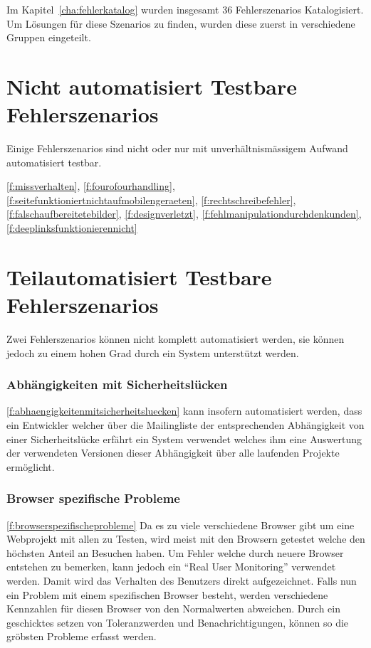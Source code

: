 Im Kapitel~\ref{cha:fehlerkatalog} wurden insgesamt 36 Fehlerszenarios Katalogisiert. Um Lösungen für diese Szenarios zu finden, wurden diese zuerst in verschiedene Gruppen eingeteilt.

\section{Nicht automatisiert Testbare Fehlerszenarios}
\label{sec:nicht_automatisiert_testbare_fehlerszenarios}
Einige Fehlerszenarios sind nicht oder nur mit unverhältnismässigem Aufwand automatisiert testbar.

\ref{f:missverhalten}, \ref{f:fourofourhandling}, \ref{f:seitefunktioniertnichtaufmobilengeraeten}, \ref{f:rechtschreibefehler}, \ref{f:falschaufbereitetebilder}, \ref{f:designverletzt}, \ref{f:fehlmanipulationdurchdenkunden}, \ref{f:deeplinksfunktionierennicht}

\section{Teilautomatisiert Testbare Fehlerszenarios}
\label{sec:teilautomatisiert_testbare_fehlerszenarios}
Zwei Fehlerszenarios können nicht komplett automatisiert werden, sie können jedoch zu einem hohen Grad durch ein System unterstützt werden.

\subsubsection{Abhängigkeiten mit Sicherheitslücken}
\label{ssub:kat_abhaengigkeitenmitsicherheitsluecken}
\ref{f:abhaengigkeitenmitsicherheitsluecken} kann insofern automatisiert werden, dass ein Entwickler welcher über die Mailingliste der entsprechenden Abhängigkeit von einer Sicherheitslücke erfährt ein System verwendet welches ihm eine Auswertung der verwendeten Versionen dieser Abhängigkeit über alle laufenden Projekte ermöglicht.

\subsubsection{Browser spezifische Probleme}
\label{ssub:kat_browser_spezifische_probleme}
\ref{f:browserspezifischeprobleme} Da es zu viele verschiedene Browser gibt um eine Webprojekt mit allen zu Testen, wird meist mit den Browsern getestet welche den höchsten Anteil an Besuchen haben. Um Fehler welche durch neuere Browser entstehen zu bemerken, kann jedoch ein ``Real User Monitoring'' verwendet werden. Damit wird das Verhalten des Benutzers direkt aufgezeichnet. Falls nun ein Problem mit einem spezifischen Browser besteht, werden verschiedene Kennzahlen für diesen Browser von den Normalwerten abweichen. Durch ein geschicktes setzen von Toleranzwerden und Benachrichtigungen, können so die gröbsten Probleme erfasst werden.


